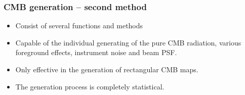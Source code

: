 \begin{frame}
\frametitle{CMB generation -- second method}

\begin{itemize}
	\item<1-> Consist of several functions and methods
	\item<1-> Capable of the individual generating of the pure CMB radiation, various foreground effects, instrument noise and beam PSF.
	\item<1-> Only effective in the generation of rectangular CMB maps.
	\item<1-> The generation process is completely statistical.
\end{itemize}

\end{frame}